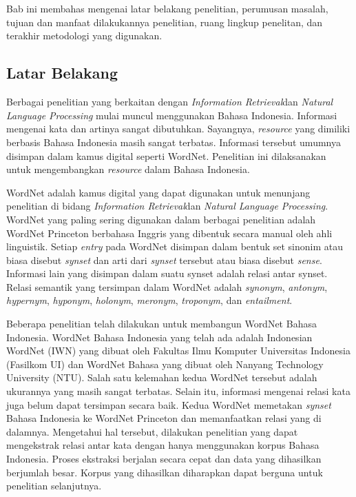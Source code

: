 \chapter{\babSatu}
Bab ini membahas mengenai latar belakang penelitian, perumusan masalah, tujuan dan manfaat dilakukannya penelitian, ruang lingkup penelitan, dan terakhir metodologi yang digunakan. 

\section{Latar Belakang}

Berbagai penelitian yang berkaitan dengan \textit{Information Retrieval}dan \textit{Natural Language Processing} mulai muncul menggunakan Bahasa Indonesia. Informasi mengenai kata dan artinya sangat dibutuhkan. Sayangnya, \textit{resource} yang dimiliki berbasis Bahasa Indonesia masih sangat terbatas. Informasi tersebut umumnya disimpan dalam kamus digital seperti WordNet. Penelitian ini dilaksanakan untuk mengembangkan \textit{resource} dalam Bahasa Indonesia. 

WordNet adalah kamus digital yang dapat digunakan untuk menunjang penelitian di bidang \textit{Information Retrieval}dan \textit{Natural Language Processing}. WordNet yang paling sering digunakan dalam berbagai penelitian adalah WordNet Princeton berbahasa Inggris yang dibentuk secara manual oleh ahli linguistik. Setiap \textit{entry} pada WordNet disimpan dalam bentuk set sinonim atau biasa disebut \textit{synset} dan arti dari \textit{synset} tersebut atau biasa disebut \textit{sense}. Informasi lain yang disimpan dalam suatu synset adalah relasi antar synset. Relasi semantik yang tersimpan dalam WordNet adalah \textit{synonym}, \textit{antonym}, \textit{hypernym}, \textit{hyponym}, \textit{holonym}, \textit{meronym}, \textit{troponym}, dan \textit{entailment}.

Beberapa penelitian telah dilakukan untuk membangun WordNet Bahasa Indonesia. WordNet Bahasa Indonesia yang telah ada adalah Indonesian WordNet (IWN) yang dibuat oleh Fakultas Ilmu Komputer Universitas Indonesia (Fasilkom UI) dan WordNet Bahasa yang dibuat oleh Nanyang Technology University (NTU). Salah satu kelemahan kedua WordNet tersebut adalah ukurannya yang masih sangat terbatas. Selain itu, informasi mengenai relasi kata juga belum dapat tersimpan secara baik. Kedua WordNet memetakan \textit{synset} Bahasa Indonesia ke WordNet Princeton dan memanfaatkan relasi yang di dalamnya. Mengetahui hal tersebut, dilakukan penelitian yang dapat mengekstrak relasi antar kata dengan hanya menggunakan korpus Bahasa Indonesia. Proses ekstraksi berjalan secara cepat dan data yang dihasilkan berjumlah besar. Korpus yang dihasilkan diharapkan dapat berguna untuk penelitian selanjutnya.

